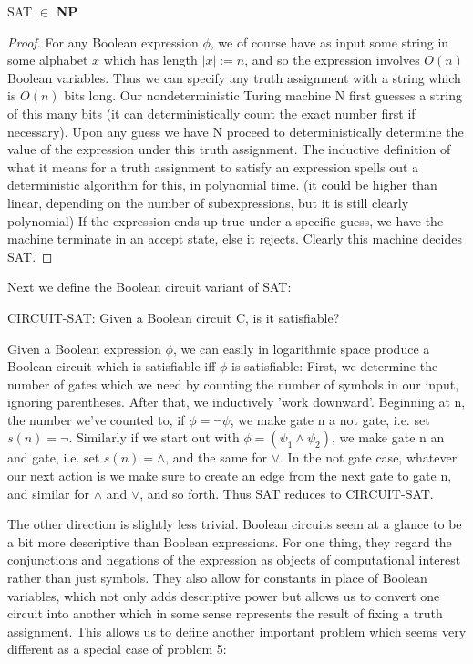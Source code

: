 \begin{fact}
    SAT $\in$ \textbf{NP}
\end{fact}
\begin{proof}
    For any Boolean expression $\phi$, we of course have as input some string in some alphabet $x$ which has length $|x| := n$, and so the expression involves $O(n)$ Boolean variables. Thus we can specify any truth assignment with a string which is $O(n)$ bits long. Our nondeterministic Turing machine N first guesses a string of this many bits (it can deterministically count the exact number first if necessary). Upon any guess we have N proceed to deterministically determine the value of the expression under this truth assignment. The inductive definition of what it means for a truth assignment to satisfy an expression spells out a deterministic algorithm for this, in polynomial time. (it could be higher than linear, depending on the number of subexpressions, but it is still clearly polynomial) If the expression ends up true under a specific guess, we have the machine terminate in an accept state, else it rejects. Clearly this machine decides SAT. 
\end{proof}
Next we define the Boolean circuit variant of SAT:
\begin{problem}
    CIRCUIT-SAT: Given a Boolean circuit C, is it satisfiable?
\end{problem}
Given a Boolean expression $\phi$, we can easily in logarithmic space produce a Boolean circuit which is satisfiable iff $\phi$ is satisfiable: First, we determine the number of gates which we need by counting the number of symbols in our input, ignoring parentheses. After that, we inductively 'work downward'. Beginning at n, the number we've counted to, if $\phi = \neg \psi$, we make gate n a not gate, i.e. set $s(n)=\neg$. Similarly if we start out with $\phi = (\psi_1 \wedge \psi_2)$, we make gate n an and gate, i.e. set $s(n)= \wedge$, and the same for $\vee$. In the not gate case, whatever our next action is we make sure to create an edge from the next gate to gate n, and similar for $\wedge$ and $\vee$, and so forth. Thus SAT reduces to CIRCUIT-SAT.
\par The other direction is slightly less trivial. Boolean circuits seem at a glance to be a bit more descriptive than Boolean expressions. For one thing, they regard the conjunctions and negations of the expression as objects of computational interest rather than just symbols. They also allow for constants in place of Boolean variables, which not only adds descriptive power but allows us to convert one circuit into another which in some sense represents the result of fixing a truth assignment. This allows us to define another important problem which seems very different as a special case of problem 5:

